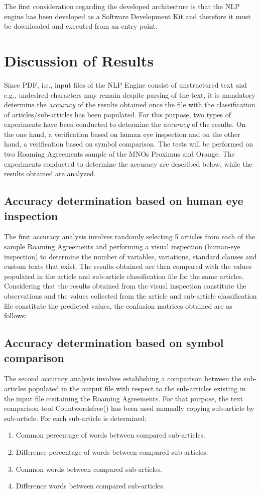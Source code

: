 \documentclass[conference]{style/IEEEtran}
\begin{document}
The first consideration regarding the developed architecture is that the NLP engine has been developed as a Software Development Kit and therefore it must be downloaded and executed from an entry point. 

\section{Discussion of Results}
Since PDF, i.e., input files of the NLP Engine consist of unstructured text and e.g., undesired characters may remain despite parsing of the text, it is mandatory determine the \textit{accuracy} of the results obtained once the file with the classification of articles/sub-articles has been populated. For this purpose, two types of experiments have been conducted to determine the \textit{accuracy} of the results. On the one hand, a verification based on human eye inspection and on the other hand, a verification based on symbol comparison. The tests will be performed on two Roaming Agreements sample of the MNOs Proximus and Orange. The experiments conducted to determine the accuracy are described below, while the results obtained are analyzed.

\subsection{Accuracy determination based on human eye inspection}
The first accuracy analysis involves randomly selecting 5 articles from each of the sample Roaming Agreements and performing a visual inspection (human-eye inspection) to determine the number of variables, variations, standard clauses and custom texts that exist. The results obtained are then compared with the values populated in the article and sub-article classification file for the same articles. Considering that the results obtained from the visual inspection constitute the observations and the values collected from the article and sub-article classification file constitute the predicted values, the confusion matrices obtained are as follows:

\subsection{Accuracy determination based on symbol comparison}
The second accuracy analysis involves establishing a comparison between the sub-articles populated in the output file with respect to the sub-articles existing in the input file containing the Roaming Agreements. For that purpose, the text comparison tool Countwordsfree(\cite{countwordsfree}) has been used manually copying sub-article by sub-article. For each sub-article is determined:
 \begin{enumerate}
\item Common percentage of words between compared sub-articles.
\item Difference percentage of words between compared sub-articles.
\item Common words between compared sub-articles.
\item Difference words between compared sub-articles.
\end{enumerate}
\end{document}
